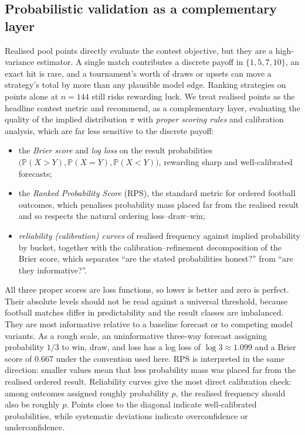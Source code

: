 \documentclass[11pt]{article}
\newcommand{\Prob}{\mathbb{P}}
\begin{document}
\subsection{Probabilistic validation as a complementary layer}

Realised pool points directly evaluate the contest objective, but they are a high-variance estimator.
A single match contributes a discrete payoff in
$\{1,5,7,10\}$, an exact hit is rare, and a tournament's worth of draws or upsets can move a
strategy's total by more than any plausible model edge. Ranking strategies on points alone at
\(n=144\) still risks rewarding luck. We treat realised points as the headline contest metric
and recommend, as a complementary layer, evaluating the quality of the implied distribution
$\pi$ with \emph{proper scoring rules} and calibration analysis, which are far less sensitive to
the discrete payoff:
\begin{itemize}
\item the \emph{Brier score} and \emph{log loss} on the result probabilities
$\big(\Prob(X>Y),\Prob(X=Y),\Prob(X<Y)\big)$, rewarding sharp and well-calibrated forecasts;
\item the \emph{Ranked Probability Score} (RPS), the standard metric for ordered football
outcomes, which penalises probability mass placed far from the realised result and so respects
the natural ordering loss--draw--win;
\item \emph{reliability (calibration) curves} of realised frequency against implied probability
by bucket, together with the calibration--refinement decomposition of the Brier score, which
separates ``are the stated probabilities honest?'' from ``are they informative?''.
\end{itemize}
All three proper scores are loss functions, so lower is better and zero is perfect. Their
absolute levels should not be read against a universal threshold, because football matches
differ in predictability and the result classes are imbalanced. They are most informative
relative to a baseline forecast or to competing model variants. As a rough scale, an
uninformative three-way forecast assigning probability \(1/3\) to win, draw, and loss has
a log loss of \(\log 3 \approx 1.099\) and a Brier score of \(0.667\) under the convention used here.
RPS is interpreted in the same direction: smaller values mean that less probability mass was
placed far from the realised ordered result. Reliability curves give the most direct
calibration check: among outcomes assigned roughly probability \(p\), the realised frequency
should also be roughly \(p\). Points close to the diagonal indicate well-calibrated
probabilities, while systematic deviations indicate overconfidence or underconfidence.
\end{document}
